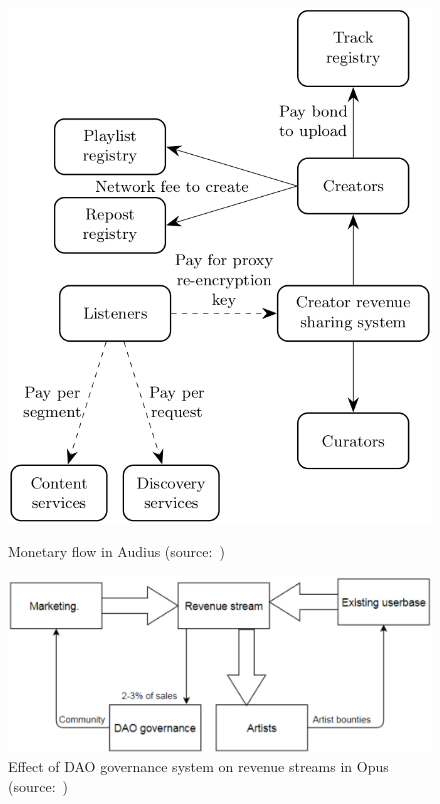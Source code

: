 \begin{figure}
        \includegraphics[width=1\linewidth]{related-work/audius-money-flow.png}
        \caption{Monetary flow in Audius (source:~\cite{audius2018})}
        \label{fig:monetary-flow-audius}
    \endminipage\hfill
        \includegraphics[width=1\linewidth]{related-work/opus-dao.png}
        \caption{Effect of DAO governance system on revenue streams in Opus (source:~\citep{jia2016opus})}
        \label{fig:opus-dao}
    \endminipage
\end{figure}

